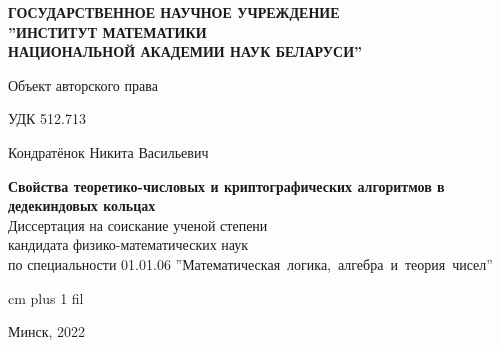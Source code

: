 \documentclass[_00_autoref.tex]{subfiles}
\begin{document}
\thispagestyle{empty}
\normalsize
\begin{center}
{\fontsize{16}{16}\selectfont \textbf{ГОСУДАРСТВЕННОЕ НАУЧНОЕ УЧРЕЖДЕНИЕ\\''ИНСТИТУТ МАТЕМАТИКИ\\НАЦИОНАЛЬНОЙ АКАДЕМИИ НАУК БЕЛАРУСИ''}}
\end{center}
\vspace{6ex}
\normalsize

\noindent Объект авторского права\par
\noindent УДК 512.713

\normalsize
\begin{center}
\vspace{6ex}
{\fontsize{16}{16}\selectfont Кондратёнок Никита Васильевич}
\end{center}
\vspace{0ex}
\begin{center}
\large
\textbf{Свойства теоретико-числовых и криптографических алгоритмов в дедекиндовых кольцах}\\
\vspace{4ex}
{\fontsize{15}{15}\selectfont Диссертация на соискание ученой степени}\\
{\fontsize{15}{15}\selectfont кандидата физико-математических наук}\\
\vspace{2ex}
{\fontsize{15}{15}\selectfont по специальности 01.01.06 ''Математическая~логика,~алгебра~и~теория~чисел''}
\vspace{2ex}
\end{center}

 cm plus 1 fil
\begin{center}
Минск, 2022
\end{center}
\eject
\end{document}
